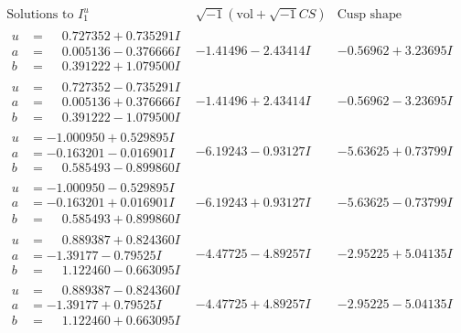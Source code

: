 \documentclass[1p]{elsarticle_modified}
\theoremstyle{definition}
\newcommand{\I}{\sqrt{-1}}
\begin{document}
$$\begin{array}{c|c|c}  
\text{Solutions to }I^u_{1}& \I (\text{vol} + \sqrt{-1}CS) & \text{Cusp shape}\\
 \hline 
\begin{aligned}
u &= \phantom{-}0.727352 + 0.735291 I \\
a &= \phantom{-}0.005136 - 0.376666 I \\
b &= \phantom{-}0.391222 + 1.079500 I\end{aligned}
 & -1.41496 - 2.43414 I & -0.56962 + 3.23695 I \\ \hline\begin{aligned}
u &= \phantom{-}0.727352 - 0.735291 I \\
a &= \phantom{-}0.005136 + 0.376666 I \\
b &= \phantom{-}0.391222 - 1.079500 I\end{aligned}
 & -1.41496 + 2.43414 I & -0.56962 - 3.23695 I \\ \hline\begin{aligned}
u &= -1.000950 + 0.529895 I \\
a &= -0.163201 - 0.016901 I \\
b &= \phantom{-}0.585493 - 0.899860 I\end{aligned}
 & -6.19243 - 0.93127 I & -5.63625 + 0.73799 I \\ \hline\begin{aligned}
u &= -1.000950 - 0.529895 I \\
a &= -0.163201 + 0.016901 I \\
b &= \phantom{-}0.585493 + 0.899860 I\end{aligned}
 & -6.19243 + 0.93127 I & -5.63625 - 0.73799 I \\ \hline\begin{aligned}
u &= \phantom{-}0.889387 + 0.824360 I \\
a &= -1.39177 - 0.79525 I \\
b &= \phantom{-}1.122460 - 0.663095 I\end{aligned}
 & -4.47725 - 4.89257 I & -2.95225 + 5.04135 I \\ \hline\begin{aligned}
u &= \phantom{-}0.889387 - 0.824360 I \\
a &= -1.39177 + 0.79525 I \\
b &= \phantom{-}1.122460 + 0.663095 I\end{aligned}
 & -4.47725 + 4.89257 I & -2.95225 - 5.04135 I \\ \hline\begin{aligned}

\end{aligned}
\end{array}$$
\end{document}
